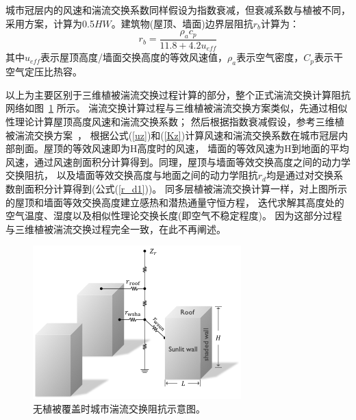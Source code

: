 城市冠层内的风速和湍流交换系数同样假设为指数衰减，但衰减系数与植被不同，
采用\citet{masson2000physically}方案，计算为0.5$HW$。建筑物(屋顶、墙面)边界层阻抗$r_b$计算为\citep{oleson2008urban}：
\begin{equation}
r_{b}=\frac{\rho_{a} c_{p}}{11.8+4.2 u_{e f f}}
\end{equation}
其中$u_{eff}$表示屋顶高度/墙面交换高度的等效风速值，$\rho_a$表示空气密度，$C_p$表示干空气定压比热容。

以上为主要区别于三维植被湍流交换过程计算的部分，整个正式湍流交换计算阻抗网络如图~\ref{fig:无植被覆盖时城市湍流交换阻抗示意图} 所示。
湍流交换计算过程与三维植被湍流交换方案类似，先通过相似性理论计算屋顶高度风速和湍流交换系数；
然后根据指数衰减假设，参考三维植被湍流交换方案~\citep{dai2019different}，
根据公式(\ref{uz})和(\ref{Kz})计算风速和湍流交换系数在城市冠层内部剖面。屋顶的等效风速即为H高度时的风速，
墙面的等效风速为H到地面的平均风速，通过风速剖面积分计算得到。同理，屋顶与墙面等效交换高度之间的动力学交换阻抗，
以及墙面等效交换高度与地面之间的动力学阻抗$r_d$均是通过对交换系数剖面积分计算得到(公式(\ref{r_d1}))。
同多层植被湍流交换计算一样，对上图所示的屋顶和墙面等效交换高度建立感热和潜热通量守恒方程，
迭代求解其高度处的空气温度、湿度以及相似性理论交换长度(即空气不稳定程度)。
因为这部分过程与三维植被湍流交换过程完全一致，在此不再阐述。
{
\begin{figure}[]
\centering
\includegraphics{Figures/城市模式/无植被覆盖时城市湍流交换阻抗示意图.png}
\caption{无植被覆盖时城市湍流交换阻抗示意图。}
\label{fig:无植被覆盖时城市湍流交换阻抗示意图}
\end{figure}
}


